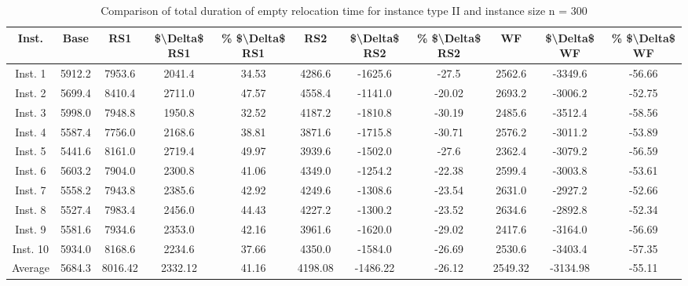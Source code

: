 \begin{table}[H]
\centering
\begin{tabular}{ccccccccccc}
  \hline
  \textbf{Inst.} & \textbf{Base} & \textbf{RS1} & \textbf{\$\textbackslash{}Delta\$  RS1} & \textbf{\% \$\textbackslash{}Delta\$  RS1} & \textbf{RS2} & \textbf{\$\textbackslash{}Delta\$  RS2} & \textbf{\% \$\textbackslash{}Delta\$  RS2} & \textbf{WF} & \textbf{\$\textbackslash{}Delta\$  WF} & \textbf{\% \$\textbackslash{}Delta\$  WF} \\\hline
  Inst. 1 & 5912.2 & 7953.6 & 2041.4 & 34.53 & 4286.6 & -1625.6 & -27.5 & 2562.6 & -3349.6 & -56.66 \\
  Inst. 2 & 5699.4 & 8410.4 & 2711.0 & 47.57 & 4558.4 & -1141.0 & -20.02 & 2693.2 & -3006.2 & -52.75 \\
  Inst. 3 & 5998.0 & 7948.8 & 1950.8 & 32.52 & 4187.2 & -1810.8 & -30.19 & 2485.6 & -3512.4 & -58.56 \\
  Inst. 4 & 5587.4 & 7756.0 & 2168.6 & 38.81 & 3871.6 & -1715.8 & -30.71 & 2576.2 & -3011.2 & -53.89 \\
  Inst. 5 & 5441.6 & 8161.0 & 2719.4 & 49.97 & 3939.6 & -1502.0 & -27.6 & 2362.4 & -3079.2 & -56.59 \\
  Inst. 6 & 5603.2 & 7904.0 & 2300.8 & 41.06 & 4349.0 & -1254.2 & -22.38 & 2599.4 & -3003.8 & -53.61 \\
  Inst. 7 & 5558.2 & 7943.8 & 2385.6 & 42.92 & 4249.6 & -1308.6 & -23.54 & 2631.0 & -2927.2 & -52.66 \\
  Inst. 8 & 5527.4 & 7983.4 & 2456.0 & 44.43 & 4227.2 & -1300.2 & -23.52 & 2634.6 & -2892.8 & -52.34 \\
  Inst. 9 & 5581.6 & 7934.6 & 2353.0 & 42.16 & 3961.6 & -1620.0 & -29.02 & 2417.6 & -3164.0 & -56.69 \\
  Inst. 10 & 5934.0 & 8168.6 & 2234.6 & 37.66 & 4350.0 & -1584.0 & -26.69 & 2530.6 & -3403.4 & -57.35 \\
  Average & 5684.3 & 8016.42 & 2332.12 & 41.16 & 4198.08 & -1486.22 & -26.12 & 2549.32 & -3134.98 & -55.11 \\\hline
\end{tabular}
\caption{Comparison of total duration of empty relocation time for instance type II and instance size n = 300}
\label{tab:wait:resrelocation-empty-relocation-comparison_II_300}
\end{table}
